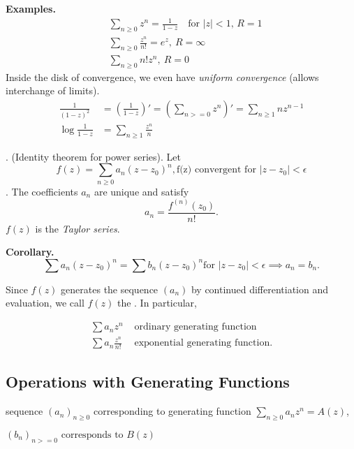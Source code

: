 \textbf{Examples.}
\begin{align*}
    &\sum_{n≥0} z^n =
        \frac1{1-z}\quad\text{for $|z|<1$, } R = 1 \\
    &\sum_{n≥0} \frac{z^n}{n!} =
        e^z, ~R = ∞ \\
    &\sum_{n≥0} n! z^n, ~R = 0
\end{align*}
Inside the disk of convergence, we even have \emph{uniform convergence} (allows interchange of limits).
\begin{align*}
    \frac1{(1-z)^2}
    &= \left(\frac1{1-z}\right)'
    = \left(\sum_{n>=0} z^n\right)'
    = \sum_{n≥1} n z^{n-1} \\
    \log\frac{1}{1-z} &= \sum_{n≥1} \frac{z^n}{n}
\end{align*}

\Theorem. (Identity theorem for power series).
Let
\[
    f(z) = \sum_{n≥0} a_n (z-z_0)^n,
    \text{f(z) convergent for $|z-z_0| < \epsilon$}
\].
The coefficients $a_n$ are unique and satisfy
\[
    a_n = \frac{f^{(n)}(z_0)}{n!}.
\]
$f(z)$ is the \emph{Taylor series}.

\textbf{Corollary.}
\[
    \sum a_n (z-z_0)^n =
    \sum b_n (z-z_0)^n
    \text{for $|z-z_0| < \epsilon$}
    \implies
    a_n = b_n.
\]

Since $f(z)$ generates the sequence $(a_n)$ by continued differentiation and evaluation, we call $f(z)$ the . In particular,

\begin{align*}
\sum a_n z^n & \text{ ordinary generating function} \\
\sum a_n \frac{z^n}{n!} & \text{ exponential generating function.}
\end{align*}


\subsection{Operations with Generating Functions}

sequence $(a_n)_{n≥0}$ corresponding to generating function
$\sum_{n≥0} a_n z^n = A(z)$,

$(b_n)_{n>=0} \text{ corresponds to } B(z)$

